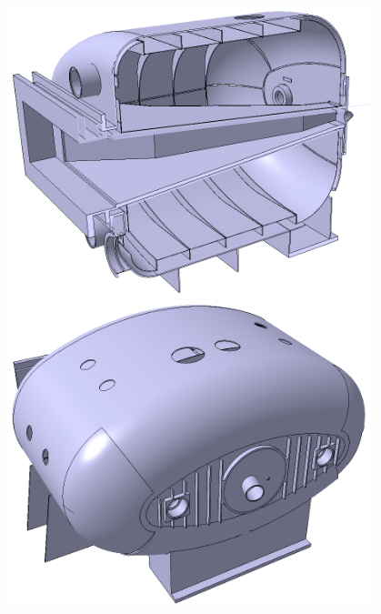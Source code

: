 \begin{figure}[H]
\begin{minipage}[b]{0.495\textwidth}
\includegraphics[width=0.95\textwidth]{pictures/GLAD3.png}
\caption{}
\label{fig:GLAD3}
\end{minipage}
\hspace{0.01\textwidth}
\begin{minipage}[b]{0.495\textwidth}
\includegraphics[width=0.95\textwidth]{pictures/GLAD4.png}
\caption{}
\label{fig:GLAD4}
\end{minipage}
\end{figure}


